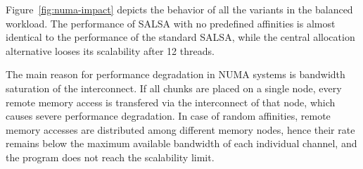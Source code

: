 Figure~\ref{fig:numa-impact} depicts the behavior of all the variants in the balanced workload. The performance of SALSA with no predefined affinities is almost identical to the performance of the standard SALSA, while the central allocation alternative looses its scalability after 12 threads. 

The main reason for performance degradation in NUMA systems is bandwidth saturation of the interconnect. If all chunks are placed on a single node, every remote memory access is transfered via the interconnect of that node, which causes severe performance degradation. In case of random affinities, remote memory accesses are distributed among different memory nodes, hence their rate remains below the maximum available bandwidth of each individual channel, and the program does not reach the scalability limit. 